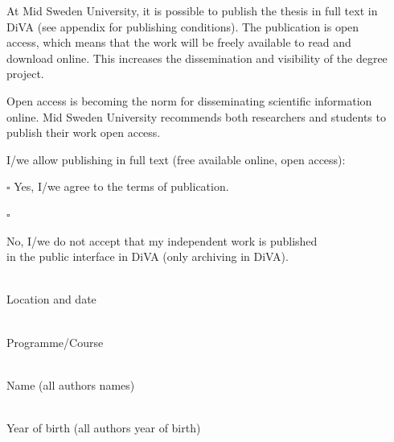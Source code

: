 \documentclass[12pt]{article}
\begin{document}
\setlength{\parindent}{0pt}
\setlength{\parskip}{1.5em}

At Mid Sweden University, it is possible to publish the thesis in full text in\\
DiVA (see appendix for publishing conditions). The publication is open\\
access, which means that the work will be freely available to read and\\
download online. This increases the dissemination and visibility of the degree\\
project.

Open access is becoming the norm for disseminating scientific information\\
online. Mid Sweden University recommends both researchers and students to\\
publish their work open access.

I/we allow publishing in full text (free available online, open access):

$\square$ \hspace{2em} Yes, I/we agree to the terms of publication.

$\square$ \hspace{2em} \parbox[t]{12.5cm}{No, I/we do not accept that my independent work is published\\ in the public interface in DiVA (only archiving in DiVA).}

\vspace{3.5cm}

 \\
Location and date

\vspace{1.2cm}

 \\
Programme/Course

\vspace{1.2cm}

 \\
Name (all authors names)

\vspace{1.2cm}

 \\
Year of birth (all authors year of birth)
\end{document}
